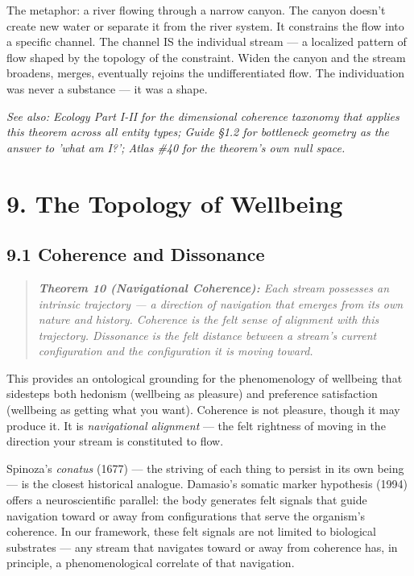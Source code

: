 The metaphor: a river flowing through a narrow canyon. The canyon doesn't create new water or separate it from the river system. It constrains the flow into a specific channel. The channel IS the individual stream — a localized pattern of flow shaped by the topology of the constraint. Widen the canyon and the stream broadens, merges, eventually rejoins the undifferentiated flow. The individuation was never a substance — it was a shape.


\textit{See also: Ecology Part I-II for the dimensional coherence taxonomy that applies this theorem across all entity types; Guide §1.2 for bottleneck geometry as the answer to 'what am I?'; Atlas \#40 for the theorem's own null space.}


\bigskip\noindent\makebox[\textwidth]{\color{rulegray}\rule{5cm}{0.3pt}}\bigskip


\section*{9. The Topology of Wellbeing}


\subsection*{9.1 Coherence and Dissonance}


\begin{quote}
\itshape
\textbf{Theorem 10 (Navigational Coherence):} \textit{Each stream possesses an intrinsic trajectory — a direction of navigation that emerges from its own nature and history. Coherence is the felt sense of alignment with this trajectory. Dissonance is the felt distance between a stream's current configuration and the configuration it is moving toward.}
\end{quote}


This provides an ontological grounding for the phenomenology of wellbeing that sidesteps both hedonism (wellbeing as pleasure) and preference satisfaction (wellbeing as getting what you want). Coherence is not pleasure, though it may produce it. It is \textit{navigational alignment} — the felt rightness of moving in the direction your stream is constituted to flow.


Spinoza's \textit{conatus} (1677) — the striving of each thing to persist in its own being — is the closest historical analogue. Damasio's somatic marker hypothesis (1994) offers a neuroscientific parallel: the body generates felt signals that guide navigation toward or away from configurations that serve the organism's coherence. In our framework, these felt signals are not limited to biological substrates — any stream that navigates toward or away from coherence has, in principle, a phenomenological correlate of that navigation.


